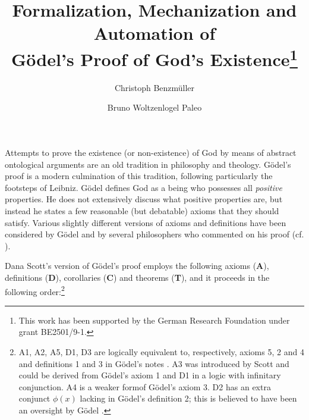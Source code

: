\documentclass{llncs}
\title{ Formalization, Mechanization and Automation %
  of \\ G\"{o}del's Proof of God's Existence\thanks{This work has been
    supported by the German Research Foundation under grant
    BE2501/9-1.}  }
\author{
  Christoph Benzm\"{u}ller\inst{1} 
  \and 
  Bruno Woltzenlogel Paleo\inst{2}
}
\institute{
  Dahlem Center for Intelligent Sstems, Freie Universit\"{a}t Berlin, Germany\\
  \email{c.benzmueller@gmail.com}
  \and 
  Theory and Logic Group, Vienna University of Technology, Austria \\
  \email{bruno@logic.at}
}
\begin{document}
\maketitle

Attempts to prove the existence (or non-existence) of God by means of
abstract ontological arguments are an old tradition in philosophy and
theology.  G\"{o}del's proof \cite{Goedel1970,GoedelNotes} is a modern culmination of
this tradition, following particularly the footsteps of Leibniz.
%
G\"{o}del defines God as a being who possesses all \emph{positive} properties.
He does not extensively discuss what positive properties are, 
but instead he states a few reasonable (but debatable) axioms that they should satisfy.
Various slightly different versions of axioms and definitions have
been considered by G\"{o}del and by several philosophers who commented
on his proof
(cf. \cite{sobel2004logic,AndersonGettings,Fitting,Adams,ContemporaryBibliography}). 

Dana Scott's version of G\"odel's proof \cite{ScottNotes} employs the
following axioms (\textbf{A}), definitions (\textbf{D}), corollaries
(\textbf{C}) and theorems (\textbf{T}), and it proceeds in the
following order:\footnote{ A1, A2, A5, D1, D3 are logically
  equivalent to, respectively, axioms 5, 2 and 4 and definitions 1 and
  3 in G\"odel's notes \cite{Goedel1970,GoedelNotes}. 
  A3 was introduced by Scott \cite{ScottNotes} and 
  could be derived from G\"odel's axiom 1 and
  D1 in a logic with infinitary conjunction. 
  A4 is a weaker formof G\"odel's axiom 3. 
  D2 has an extra conjunct $\phi(x)$ lacking in G\"odel's definition 2; 
  this is believed to have been 
  an oversight by G\"odel \cite{Hazen}.}
\end{document}
